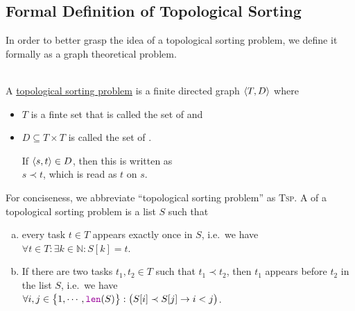 \subsection{Formal Definition of Topological Sorting}
In order to better grasp the idea of a topological sorting problem, we define it formally as a graph
theoretical problem.
\begin{Definition}  \hspace*{\fill} \\
  A \href{https://en.wikipedia.org/wiki/Topological_sorting}{topological sorting problem} is a finite directed graph
  $\pair(T, D)$ where
  \begin{itemize}
  \item $T$ is a finte set that is called the set of  and 
  \item $D \subseteq T \times T$ is called the set of .

        If $\pair(s, t) \in D$, then this is written as 
        \\[0.2cm]
        \hspace*{1.3cm}
        $s \prec t$, \quad which is read as $t$  on $s$.
  \end{itemize}
  For conciseness, we abbreviate ``topological sorting problem'' as \textsc{Tsp}.
  A  of a topological sorting problem is a list $S$ such that
  \begin{enumerate}[(a)]
  \item every task $t \in T$ appears exactly once in $S$, i.e.~we have
        \\[0.2cm]
        \hspace*{1.3cm}
        $\forall t \in T: \exists k \in \mathbb{N}: S[k] = t$.
\item If there are two tasks $t_1, t_2 \in T$ such that $t_1 \prec t_2$, then $t_1$ appears before $t_2$
        in the list $S$, i.e.~we have
        \\[0.2cm]
        \hspace*{1.3cm}
        $\forall i,j \in \bigl\{1,\cdots,\mytt{len}(S)\bigr\}:\bigl(S[i] \prec S[j] \rightarrow i < j\bigr)$.
        \eox
\end{enumerate}

\end{Definition}

